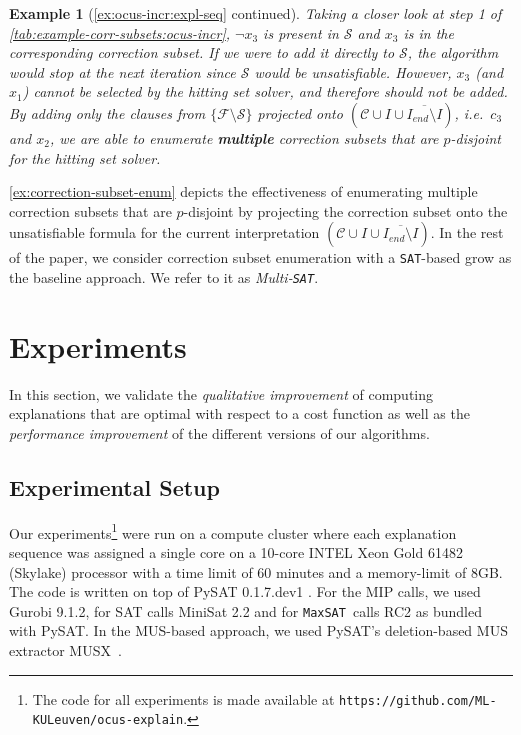 \documentclass[twoside,11pt]{article}
\newcommand\m[1]{\mathcal{#1}}
\newtheorem{example}{Example}
\newcommand\comment[1]{\marginpar{\tiny #1}}
\renewcommand\comment[1]{#1}
\newcommand{\tias}[1]{{\comment{\color{blue}Tias:#1}}}
\newcommand\Iend{\ensuremath{I_\mathit{end} }\xspace}
\newcommand\formula{\ensuremath{\m{F} }\xspace}
\newcommand\formulac{\ensuremath{\m{C} }\xspace}
\newcommand\sat{\texttt{{SAT}}\xspace}
\newcommand\maxsat{\texttt{MaxSAT}}
\begin{document}
\begin{example}[\cref{ex:ocus-incr:expl-seq} continued]
	Taking a closer look at step 1 of \cref{tab:example-corr-subsets:ocus-incr}, $\lnot x_3$ is present in $\m{S}$ and $x_3$ is in the corresponding correction subset. If we were to add it directly to $\m{S}$, the algorithm would stop at the next iteration since $\m{S}$ would be unsatisfiable. However, $x_3$ (and $x_1$) cannot be selected by the hitting set solver, and therefore should not be added. 
	By adding only the clauses from $\{\formula \setminus \m{S}\}$ projected onto $ (\formulac\cup I \cup \overline{\Iend \setminus I})$, i.e.~$c_3$ and $x_2$, we are able to enumerate \textbf{multiple} correction subsets that are $p$-disjoint for the hitting set solver. %
\end{example}

\cref{ex:correction-subset-enum} depicts the effectiveness of enumerating multiple correction subsets that are $p$-disjoint by projecting the correction subset onto the unsatisfiable formula for the current interpretation $(\formulac\cup I \cup \overline{\Iend \setminus I})$. 
In the rest of the paper, we consider correction subset enumeration with a \sat-based grow as the baseline approach. We refer to it as \emph{Multi-\sat}.


\section{Experiments}\label{sec:experiments}

In this section, we validate the \emph{qualitative improvement} of computing explanations that are optimal with respect to a cost function as well as the \emph{performance improvement} of the different versions of our algorithms.

\subsection*{Experimental Setup}

Our experiments\footnote{The code for all experiments is made available at \texttt{https://github.com/ML-KULeuven/ocus-explain}.} were run on a compute cluster where each explanation sequence was assigned a single core on a 10-core INTEL Xeon Gold 61482 (Skylake) processor with a time limit of 60 minutes and a memory-limit of 8GB. The code is written on top of PySAT 0.1.7.dev1 \cite{pysat}.
For the MIP calls, we used Gurobi 9.1.2, for SAT calls MiniSat 2.2 and for \maxsat~calls RC2 as bundled with PySAT.
In the MUS-based approach, we used PySAT’s deletion-based MUS extractor MUSX~\cite{marques2010minimal}. 
\end{document}
